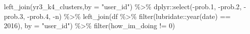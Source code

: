\documentclass[
]{article}
\newenvironment{Shaded}{\begin{snugshade}}{\end{snugshade}}
\newcommand{\AttributeTok}[1]{\textcolor[rgb]{0.77,0.63,0.00}{#1}}
\newcommand{\DecValTok}[1]{\textcolor[rgb]{0.00,0.00,0.81}{#1}}
\newcommand{\FloatTok}[1]{\textcolor[rgb]{0.00,0.00,0.81}{#1}}
\newcommand{\FunctionTok}[1]{\textcolor[rgb]{0.00,0.00,0.00}{#1}}
\newcommand{\NormalTok}[1]{#1}
\newcommand{\SpecialCharTok}[1]{\textcolor[rgb]{0.00,0.00,0.00}{#1}}
\newcommand{\StringTok}[1]{\textcolor[rgb]{0.31,0.60,0.02}{#1}}
\begin{document}
\begin{Shaded}
\begin{Highlighting}[]
  \FunctionTok{left\_join}\NormalTok{(yr3\_k4\_clusters,}\AttributeTok{by =} \StringTok{"user\_id"}\NormalTok{) }\SpecialCharTok{\%\textgreater{}\%} 
\NormalTok{  dplyr}\SpecialCharTok{::}\FunctionTok{select}\NormalTok{(}\SpecialCharTok{{-}}\NormalTok{prob}\FloatTok{.1}\NormalTok{,}
          \SpecialCharTok{{-}}\NormalTok{prob}\FloatTok{.2}\NormalTok{,}
          \SpecialCharTok{{-}}\NormalTok{prob}\FloatTok{.3}\NormalTok{,}
          \SpecialCharTok{{-}}\NormalTok{prob}\FloatTok{.4}\NormalTok{,}
          \SpecialCharTok{{-}}\NormalTok{n) }\SpecialCharTok{\%\textgreater{}\%} 
  \FunctionTok{left\_join}\NormalTok{(df }\SpecialCharTok{\%\textgreater{}\%}
  \FunctionTok{filter}\NormalTok{(lubridate}\SpecialCharTok{::}\FunctionTok{year}\NormalTok{(date) }\SpecialCharTok{==} \DecValTok{2016}\NormalTok{),}
         \AttributeTok{by =} \StringTok{"user\_id"}\NormalTok{) }\SpecialCharTok{\%\textgreater{}\%}
  \FunctionTok{filter}\NormalTok{(how\_im\_doing }\SpecialCharTok{!=} \DecValTok{0}\NormalTok{)}



\end{Highlighting}
\end{Shaded}
\end{document}
